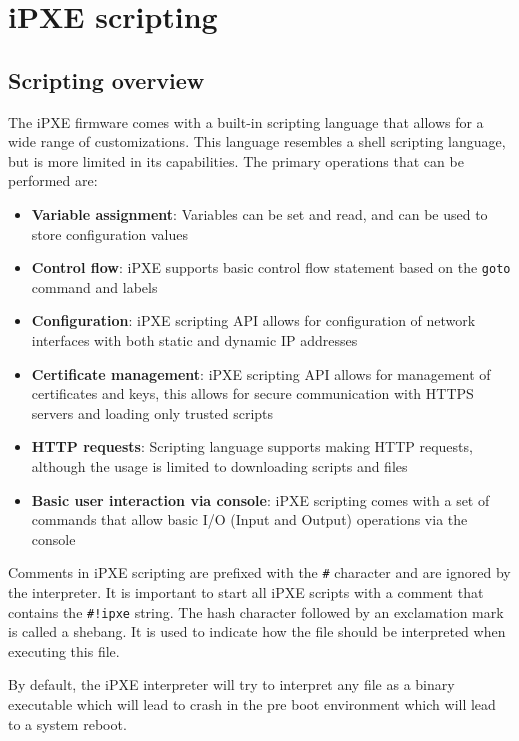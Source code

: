 \documentclass[../main.tex]{subfiles}
\begin{document}
\section{iPXE scripting}

\subsection{Scripting overview}

The iPXE firmware comes with a built-in scripting language that allows for a wide range of customizations.
This language resembles a shell scripting language, but is more limited in its capabilities.
The primary operations that can be performed are:

\begin{itemize}
  \item \textbf{Variable assignment}: Variables can be set and read, and can be used to store configuration values
  \item \textbf{Control flow}: iPXE supports basic control flow statement based on the \texttt{goto} command and labels
  \item \textbf{Configuration}: iPXE scripting API allows for configuration of network interfaces with both static and dynamic IP addresses
  \item \textbf{Certificate management}: iPXE scripting API allows for management of certificates and keys, this allows for secure communication with HTTPS servers and loading only trusted scripts
  \item \textbf{HTTP requests}: Scripting language supports making HTTP requests, although the usage is limited to downloading scripts and files
  \item \textbf{Basic user interaction via console}: iPXE scripting comes with a set of commands that allow basic I/O (Input and Output) operations via the console
\end{itemize}

Comments in iPXE scripting are prefixed with the \texttt{\#} character and are ignored by the interpreter.
It is important to start all iPXE scripts with a comment that contains the \texttt{\#!ipxe} string.
The hash character followed by an exclamation mark is called a shebang. It is used to indicate
how the file should be interpreted when executing this file.

By default, the iPXE interpreter will try to interpret any file
as a binary executable which will lead to crash in the pre boot environment which will lead to a system reboot.
\end{document}

